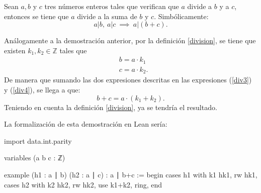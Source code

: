 \begin{teorema}
  Sean \(a, b\) y \(c\) tres números enteros tales que verifican que
  \(a\) divide a \(b\) y a \(c\), entonces se tiene que \(a\) divide a
  la suma de \(b\) y \(c\).  Simbólicamente:
  \begin{equation}
  a|b, \ a|c \ ⟹ \ a|(b+c).
  \end{equation}
\end{teorema}

\begin{demostracion}
  Análogamente a la demostración anterior, por la definición
  \ref{division}, se tiene que existen \(k_1, k_2 ∈ ℤ\) tales que
  \begin{align}
    & b = a · k_1 \label{div3} \\
    & c = a · k_2 . \label{div4}
  \end{align}
  De manera que sumando las dos expresiones descritas en las expresiones
  (\ref{div3}) y (\ref{div4}), se llega a que:
  \begin{equation*}
    b+c = a· (k_1+k_2).
  \end{equation*}
  Teniendo en cuenta la definición \ref{division}, ya se tendría
  el resultado.
\end{demostracion}

La formalización de esta demostración en Lean sería:
\begin{leancode}
import data.int.parity

variables (a b c : ℤ)

example
  (h1 : a ∣ b)
  (h2 : a ∣ c)
  : a ∣ b+c :=
begin
  cases h1 with k1 hk1,
  rw hk1,
  cases h2 with k2 hk2,
  rw hk2,
  use k1+k2,
  ring,
end
\end{leancode}



